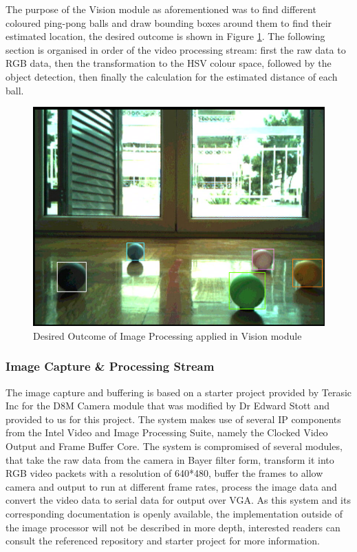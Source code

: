 \documentclass[a4paper]{article}
\begin{document}
The purpose of the Vision module as aforementioned was to find different coloured
ping-pong balls and draw bounding boxes around them to find their estimated location, 
the desired outcome is shown in Figure \ref{fig:DesiredVisionResult}. The following 
section is organised in order of the video processing stream: first the raw data to 
RGB data, then the transformation to the HSV colour space, followed by the object 
detection, then finally the calculation for the estimated distance of each ball. 

\begin{figure}[H]
	\begin{Center}
		\includegraphics[scale = 0.5]{./images/AnnotatedBalls.png}
		\caption{Desired Outcome of Image Processing applied in Vision module }
		\label{fig:DesiredVisionResult}
	\end{Center}
\end{figure}



 

\subsubsection{Image Capture \& Processing Stream}

The image capture and buffering is based on a starter project provided
by Terasic Inc for the D8M Camera module that was modified by Dr Edward Stott 
\cite{EEE2Rover} and provided to us for this project. The system makes use of 
several IP components from the Intel Video and Image Processing Suite,
namely the Clocked Video Output and Frame Buffer Core. The system is compromised
of several modules, that take the raw data from the camera in Bayer filter form\cite{TerasicD8MWeb},
transform it into RGB video packets with a resolution of 640*480, buffer the frames to allow camera and output
to run at different frame rates, process the image data and convert the video 
data to serial data for output over VGA.\cite{EEE2Rover} As this system and its 
corresponding documentation is openly available, the implementation outside of 
the image processor will not be described in more depth, interested readers can 
consult the referenced repository and starter project for more information. 
\end{document}
